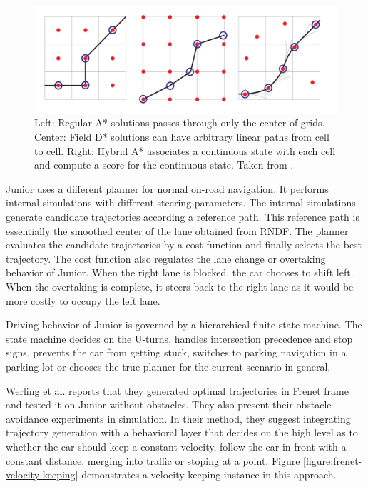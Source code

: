 \begin{figure}[h]
  \centering
  \includegraphics[width=.8\textwidth]{figures/hybridastar-comparison.png}
  \caption[A*, Field D* and Hybrid A* algorithms]{Left: Regular A* solutions
    passes through only the center of grids.  Center: Field D* solutions can
    have arbitrary linear paths from cell to cell.  Right: Hybrid A* associates
    a continuous state with each cell and compute a score for the continuous
    state. Taken from \cite{Dolgov2010PathPF}.}
  \label{figure:hybridastar-comparison}
\end{figure}

Junior uses a different planner for normal on-road navigation. It performs
internal simulations with different steering parameters. The internal
simulations generate candidate trajectories according a reference path. This
reference path is essentially the smoothed center of the lane obtained from
RNDF. The planner evaluates the candidate trajectories by a cost function and
finally selects the best trajectory. The cost function also regulates the lane
change or overtaking behavior of Junior. When the right lane is blocked, the
car chooses to shift left. When the overtaking is complete, it steers back to
the right lane as it would be more costly to occupy the left lane.

Driving behavior of Junior is governed by a hierarchical finite state machine.
The state machine decides on the U-turns, handles intersection precedence and
stop signs, prevents the car from getting stuck, switches to parking navigation
in a parking lot or chooses the true planner for the current scenario in
general.

Werling et al. \cite{Werling2010OptimalTG} reports that they generated optimal
trajectories in Frenet frame and tested it on Junior without obstacles. They
also present their obstacle avoidance experiments in simulation. In their
method, they suggest integrating trajectory generation with a behavioral layer
that decides on the high level as to whether the car should keep a constant
velocity, follow the car in front with a constant distance, merging into
traffic or stoping at a point. Figure \ref{figure:frenet-velocity-keeping}
demonstrates a velocity keeping instance in this approach.

